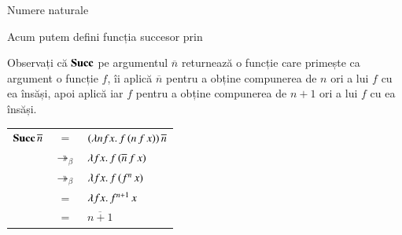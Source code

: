 \documentclass[xcolor=pdftex,romanian,colorlinks]{beamer}
\begin{document}
\begin{frame}{Numere naturale}

\begin{center}
\end{center}

\vspace{-.4cm}
Acum putem defini funcția \alert{succesor} prin
\vspace{-.2cm}
\begin{center}
\end{center}

\vspace{-.2cm}
Observați că $\mathbf{Succ}$ pe argumentul $\overline{n}$ returnează o funcție care primește ca argument o funcție $f$, îi aplică $\overline{n}$ pentru a obține compunerea de $n$ ori a lui $f$ cu ea însăși, apoi aplică iar $f$ pentru a obține compunerea de $n+1$ ori a lui $f$ cu ea însăși.

\vspace{-.2cm}
\begin{center}
\begin{tabular}{rcl}
$\mathbf{Succ}\, \overline{n}$ & $=$ & $(\lambda nfx.\,f\, (n\, f\, x))\, \overline{n}$ \\
& $\twoheadrightarrow_\beta$ & $\lambda fx.\,f\, (\overline{n}\, f\, x)$ \\
& $\twoheadrightarrow_\beta$ & $\lambda fx.\,f\, (f^n\, x)$ \\
& $=$ & $\lambda fx.\,f^{n+1}\, x$ \\
& $=$ & $\overline{n+1}$ 
\end{tabular}
\end{center}

\end{frame}
\end{document}
